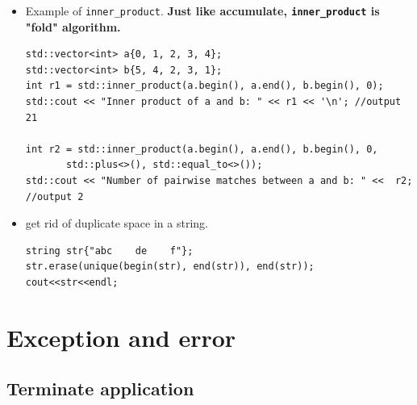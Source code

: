 \documentclass[a4paper,11pt,twoside]{book}
\begin{document}
\begin{itemize}
\item  Example of \texttt{inner\_product}. \textbf{Just like accumulate, \texttt{inner\_product} is "fold" algorithm.}

\begin{lstlisting}
std::vector<int> a{0, 1, 2, 3, 4};
std::vector<int> b{5, 4, 2, 3, 1};
int r1 = std::inner_product(a.begin(), a.end(), b.begin(), 0);
std::cout << "Inner product of a and b: " << r1 << '\n'; //output 21

int r2 = std::inner_product(a.begin(), a.end(), b.begin(), 0,
       std::plus<>(), std::equal_to<>());
std::cout << "Number of pairwise matches between a and b: " <<  r2; //output 2
\end{lstlisting}

\item get rid of duplicate space in a string.
\begin{lstlisting}
string str{"abc    de    f"};
str.erase(unique(begin(str), end(str)), end(str));
cout<<str<<endl;
\end{lstlisting}

\end{itemize}


\chapter{Exception and error}
\section{Terminate application}
\end{document}
